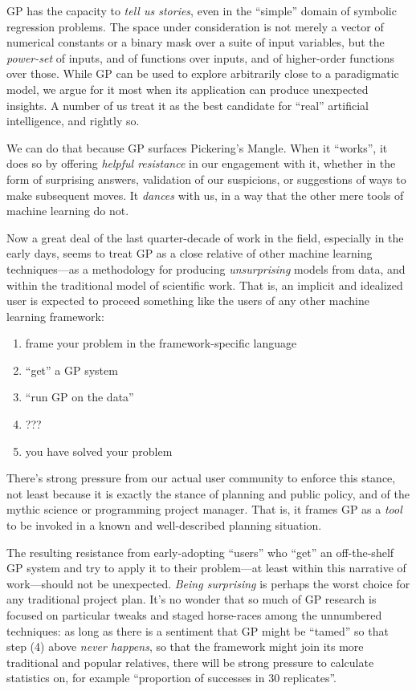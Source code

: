 GP has the capacity to \emph{tell us stories}, even in the ``simple'' domain of symbolic regression problems. The space under consideration is not merely a vector of numerical constants or a binary mask over a suite of input variables, but the \emph{power-set} of inputs, and of functions over inputs, and of higher-order functions over those. While GP can be used to explore arbitrarily close to a paradigmatic model, we argue for it most when its application can produce unexpected insights. A number of us treat it as the best candidate for ``real'' artificial intelligence, and rightly so.

We can do that because GP surfaces Pickering's Mangle. When it ``works'', it does so by offering \emph{helpful resistance} in our engagement with it, whether in the form of surprising answers, validation of our suspicions, or suggestions of ways to make subsequent moves. It \emph{dances} with us, in a way that the other mere tools of machine learning do not.

Now a great deal of the last quarter-decade of work in the field, especially in the early days, seems to treat GP as a close relative of other machine learning techniques---as a methodology for producing \emph{unsurprising} models from data, and within the traditional model of scientific work. That is, an implicit and idealized user is expected to proceed something like the users of any other machine learning framework:

\begin{enumerate}
\item frame your problem in the framework-specific language
\item ``get'' a GP system
\item ``run GP on the data''
\item ???
\item you have solved your problem
\end{enumerate}

There's strong pressure from our actual user community to enforce this stance, not least because it is exactly the stance of planning and public policy, and of the mythic science or programming project manager. That is, it frames GP as a \emph{tool} to be invoked in a known and well-described planning situation.

The resulting resistance from early-adopting ``users'' who ``get'' an off-the-shelf GP system and try to apply it to their problem---at least within this narrative of work---should not be unexpected. \emph{Being surprising} is perhaps the worst choice for any traditional project plan. It's no wonder that so much of GP research is focused on particular tweaks and staged horse-races among the unnumbered techniques: as long as there is a sentiment that GP might be ``tamed'' so that step (4) above \emph{never happens}, so that the framework might join its more traditional and popular relatives, there will be strong pressure to calculate statistics on, for example ``proportion of successes in 30 replicates''.

